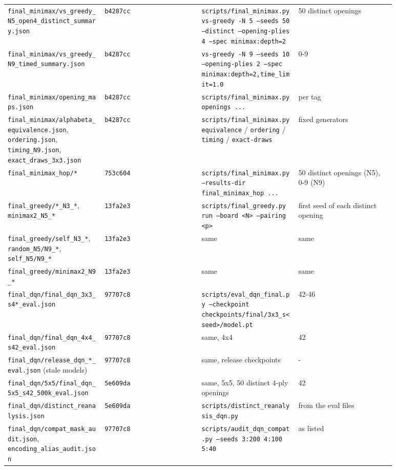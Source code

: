 \documentclass[11pt]{article}
\begin{document}
\begin{center}
\begin{longtable}{p{0.22\linewidth}p{0.22\linewidth}p{0.22\linewidth}p{0.22\linewidth}}
\texttt{final\_minimax/vs\_greedy\_N5\_open4\_distinct\_summary.json} & \texttt{b4287cc} & \texttt{scripts/final\_minimax.py vs-greedy -N 5 --seeds 50 --distinct --opening-plies 4 --spec minimax:depth=2} & 50 distinct openings \\
\texttt{final\_minimax/vs\_greedy\_N9\_timed\_summary.json} & \texttt{b4287cc} & \texttt{vs-greedy -N 9 --seeds 10 --opening-plies 2 --spec minimax:depth=2,time\_limit=1.0} & 0-9 \\
\texttt{final\_minimax/opening\_maps.json} & \texttt{b4287cc} & \texttt{scripts/final\_minimax.py openings ...} & per tag \\
\texttt{final\_minimax/alphabeta\_equivalence.json}, \texttt{ordering.json}, \texttt{timing\_N9.json}, \texttt{exact\_draws\_3x3.json} & \texttt{b4287cc} & \texttt{scripts/final\_minimax.py equivalence} / \texttt{ordering} / \texttt{timing} / \texttt{exact-draws} & fixed generators \\
\texttt{final\_minimax\_hop/*} & \texttt{753c604} & \texttt{scripts/final\_minimax.py --results-dir final\_minimax\_hop ...} & 50 distinct openings (N5), 0-9 (N9) \\
\texttt{final\_greedy/*\_N3\_*}, \texttt{minimax2\_N5\_*} & \texttt{13fa2e3} & \texttt{scripts/final\_greedy.py run --board <N> --pairing <p>} & first seed of each distinct opening \\
\texttt{final\_greedy/self\_N3\_*}, \texttt{random\_N5/N9\_*}, \texttt{self\_N5/N9\_*} & \texttt{13fa2e3} & same & same \\
\texttt{final\_greedy/minimax2\_N9\_*} & \texttt{13fa2e3} & same & same \\
\texttt{final\_dqn/final\_dqn\_3x3\_s4*\_eval.json} & \texttt{97707c8} & \texttt{scripts/eval\_dqn\_final.py --checkpoint checkpoints/final/3x3\_s<seed>/model.pt} & 42-46 \\
\texttt{final\_dqn/final\_dqn\_4x4\_s42\_eval.json} & \texttt{97707c8} & same, 4x4 & 42 \\
\texttt{final\_dqn/release\_dqn\_*\_eval.json} (stale models) & \texttt{97707c8} & same, release checkpoints & - \\
\texttt{final\_dqn/5x5/final\_dqn\_5x5\_s42\_500k\_eval.json} & \texttt{5e609da} & same, 5x5, 50 distinct 4-ply openings & 42 \\
\texttt{final\_dqn/distinct\_reanalysis.json} & \texttt{5e609da} & \texttt{scripts/distinct\_reanalysis\_dqn.py} & from the eval files \\
\texttt{final\_dqn/compat\_mask\_audit.json}, \texttt{encoding\_alias\_audit.json} & \texttt{97707c8} & \texttt{scripts/audit\_dqn\_compat.py --seeds 3:200 4:100 5:40} & as listed \\

\end{longtable}
\end{center}
\end{document}
